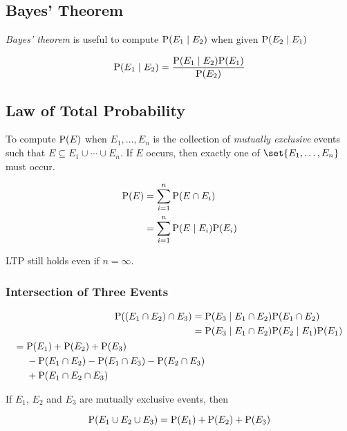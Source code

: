 \subsection{Bayes' Theorem}

\begin{definition}
    \textit{Bayes' theorem} is useful to compute $\mathrm{P}(E_1 \mid E_2)$ when given $\mathrm{P}(E_2 \mid E_1)$
    
    \begin{equation}
        \mathrm{P}(E_1 \mid E_2) = \frac{\mathrm{P}(E_1 \mid E_2) \mathrm{P}(E_1)}{\mathrm{P}(E_2)}
    \end{equation}
\end{definition}

\subsection{Law of Total Probability}

\begin{definition}
    To compute $\mathrm{P}(E)$ when $E_1, \ldots, E_n$ is the collection of \textit{mutually exclusive} events such that $E \subseteq E_1 \cup \cdots \cup E_n$. If $E$ occurs, then exactly one of $\set{E_1, \ldots, E_n}$ must occur.
    
    \begin{align}
        \mathrm{P}(E)
            &= \sum \limits_{i=1}^{n} \mathrm{P}(E \cap E_i) \\
            &= \sum \limits_{i=1}^{n} \mathrm{P}(E \mid E_i) \mathrm{P}(E_i)
    \end{align}

    LTP still holds even if $n = \infty$.
\end{definition}

\subsubsection{Intersection of Three Events}

\begin{definition}
    \begin{align}
        \mathrm{P}((E_1 \cap E_2) \cap E_3)
            ={}& \mathrm{P}(E_3 \mid E_1 \cap E_2) \mathrm{P}(E_1 \cap E_2) \\
            ={}& \mathrm{P}(E_3 \mid E_1 \cap E_2) \mathrm{P}(E_2 \mid E_1) \mathrm{P}(E_1) \\
            \begin{split}
                ={}& \mathrm{P}(E_1) + \mathrm{P}(E_2) + \mathrm{P}(E_3) \\
                &- \mathrm{P}(E_1 \cap E_2) - \mathrm{P}(E_1 \cap E_3) - \mathrm{P}(E_2 \cap E_3) \\
                &+ \mathrm{P}(E_1 \cap E_2 \cap E_3)
            \end{split}
    \end{align}
    
    If $E_1$, $E_2$ and $E_3$ are mutually exclusive events, then
    
    \begin{equation}
        \mathrm{P}(E_1 \cup E_2 \cup E_3) = \mathrm{P}(E_1) + \mathrm{P}(E_2) + \mathrm{P}(E_3)
    \end{equation}
\end{definition}
